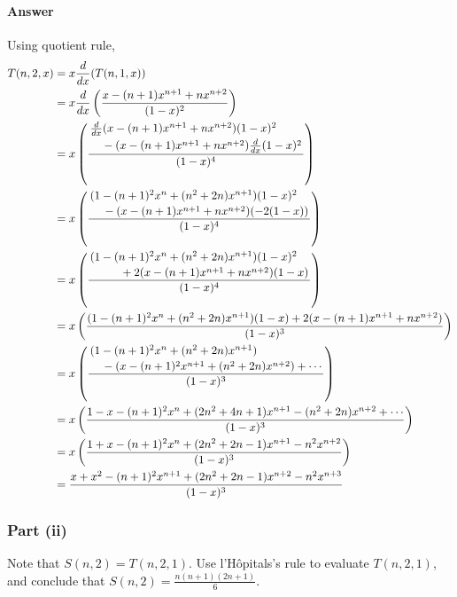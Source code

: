 \paragraph{Answer}
Using quotient rule,
\begin{align*}
    T(n, 2, x)
    &= x \frac{d}{dx} (T(n, 1, x)) \\
    &= x \frac{d}{dx} \left( \frac{x - (n + 1) x^{n + 1} +
        n x^{n + 2}}{(1 - x)^2} \right) \\
    &= x \left( \frac{\splitdfrac{\frac{d}{dx} (x - (n + 1) x^{n + 1} +
        n x^{n + 2}) (1 - x)^2}{- (x - (n + 1) x^{n + 1} + n x^{n + 2})
        \frac{d}{dx} (1 - x)^2}}{(1 - x)^4} \right) \\
    &= x \left( \frac{\splitdfrac{(1 - (n + 1)^2 x^n + (n^2 + 2 n)
        x^{n + 1}) (1 - x)^2}{- (x - (n + 1) x^{n + 1} + n x^{n + 2})
        (-2(1 - x))}}{(1 - x)^4} \right) \\
    &= x \left( \frac{\splitdfrac{(1 - (n + 1)^2 x^n + (n^2 + 2 n)
        x^{n + 1})(1 - x)^2}{+ 2 (x - (n + 1) x^{n + 1} + n x^{n + 2})
        (1 - x)}}{(1 - x)^4} \right) \\
    &= x \left( \frac{(1 - (n + 1)^2 x^n + (n^2 + 2 n) x^{n + 1})(1 - x) +
        2 (x - (n + 1) x^{n + 1} + n x^{n + 2})}{(1 - x)^3} \right) \\
    &= x \left( \frac{\splitdfrac{(1 - (n + 1)^2 x^n + (n^2 + 2 n)
        x^{n + 1})}{- (x - (n + 1)^2 x^{n + 1} + (n^2 + 2 n) x^{n + 2}) +
        \cdots}}{(1 - x)^3} \right) \\
    &= x \left( \frac{1 - x - (n + 1)^2 x^n + (2n^2 + 4 n + 1) x^{n + 1} -
        (n^2 + 2 n) x^{n + 2} + \cdots}{(1 - x)^3} \right) \\
    &= x \left( \frac{1 + x - (n + 1)^2 x^n + (2n^2 + 2 n - 1) x^{n + 1} -
        n^2 x^{n + 2}}{(1 - x)^3} \right) \\
    &= \frac{x + x^2 - (n + 1)^2 x^{n + 1} + (2n^2 + 2 n - 1) x^{n + 2} -
        n^2 x^{n + 3}}{(1 - x)^3}
\end{align*}

\subsubsection{Part (ii)}
Note that $ S(n,2) = T(n,2,1) $.
Use l'H\^{o}pitals's rule to evaluate $ T(n,2,1) $, and conclude that
    $ S(n,2) = \frac{n(n+1)(2n+1)}{6} $.

